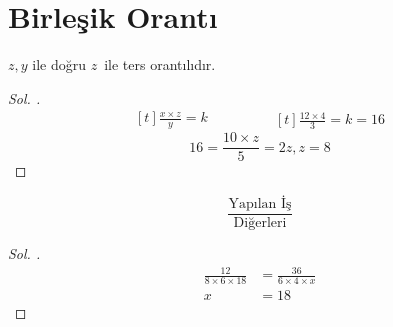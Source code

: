 \documentclass{article}
\theoremstyle{mytheoremstyle}
\theoremstyle{mytheoremstyle}
\theoremstyle{myproblemstyle}
\begin{document}
\section{Birleşik Orantı}

$ z, y $ ile doğru $ z $ ile ters orantılıdır.

\begin{problem}[$ x = 12 $, $ y = 3 $ iken $ z = 4 $ ise $ x = 10 $, $ y = 5 $ iken $ z = ? $]
\end{problem}

\begin{proof}[\textit{ Sol. }]
  \begin{equation*}
    \begin{aligned}[t]
      \frac{x \times z}{y} = k
    \end{aligned}
    \qquad\qquad
    \begin{aligned}[t]
      \frac{12 \times 4}{3} = k = 16
    \end{aligned}
  \end{equation*}
  $$ 16 = \frac{10 \times z}{5} = 2z, z = 8 $$
\end{proof}

$$ \frac{\text{Yapılan İş}}{\text{Diğerleri}} $$

\begin{problem}
\end{problem}

\begin{proof}[\textit{ Sol. }]
  \begin{align*}
    \frac{12}{8 \times 6 \times 18} &= \frac{36}{6 \times 4 \times x}\\
    x &= 18
  \end{align*}
\end{proof}
\end{document}
